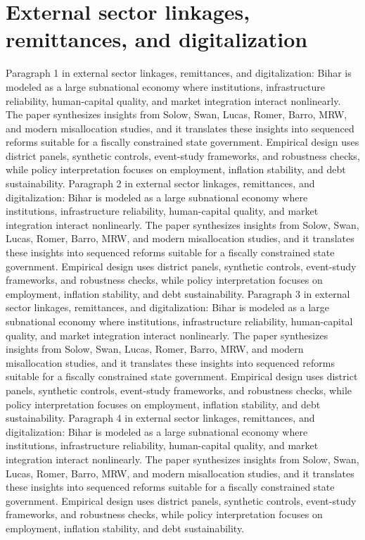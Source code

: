 \documentclass[preprint,12pt]{elsarticle}
\begin{document}
\section{External sector linkages, remittances, and digitalization}
Paragraph 1 in external sector linkages, remittances, and digitalization: Bihar is modeled as a large subnational economy where institutions, infrastructure reliability, human-capital quality, and market integration interact nonlinearly. The paper synthesizes insights from Solow, Swan, Lucas, Romer, Barro, MRW, and modern misallocation studies, and it translates these insights into sequenced reforms suitable for a fiscally constrained state government. Empirical design uses district panels, synthetic controls, event-study frameworks, and robustness checks, while policy interpretation focuses on employment, inflation stability, and debt sustainability.
Paragraph 2 in external sector linkages, remittances, and digitalization: Bihar is modeled as a large subnational economy where institutions, infrastructure reliability, human-capital quality, and market integration interact nonlinearly. The paper synthesizes insights from Solow, Swan, Lucas, Romer, Barro, MRW, and modern misallocation studies, and it translates these insights into sequenced reforms suitable for a fiscally constrained state government. Empirical design uses district panels, synthetic controls, event-study frameworks, and robustness checks, while policy interpretation focuses on employment, inflation stability, and debt sustainability.
Paragraph 3 in external sector linkages, remittances, and digitalization: Bihar is modeled as a large subnational economy where institutions, infrastructure reliability, human-capital quality, and market integration interact nonlinearly. The paper synthesizes insights from Solow, Swan, Lucas, Romer, Barro, MRW, and modern misallocation studies, and it translates these insights into sequenced reforms suitable for a fiscally constrained state government. Empirical design uses district panels, synthetic controls, event-study frameworks, and robustness checks, while policy interpretation focuses on employment, inflation stability, and debt sustainability.
Paragraph 4 in external sector linkages, remittances, and digitalization: Bihar is modeled as a large subnational economy where institutions, infrastructure reliability, human-capital quality, and market integration interact nonlinearly. The paper synthesizes insights from Solow, Swan, Lucas, Romer, Barro, MRW, and modern misallocation studies, and it translates these insights into sequenced reforms suitable for a fiscally constrained state government. Empirical design uses district panels, synthetic controls, event-study frameworks, and robustness checks, while policy interpretation focuses on employment, inflation stability, and debt sustainability.
\end{document}
